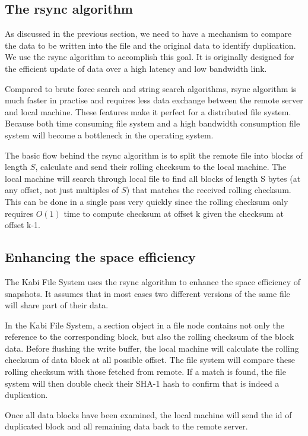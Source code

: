 \subsection{The rsync algorithm}

    As discussed in the previous section, we need to have a mechanism to compare the data to be written into the file and the original data to identify duplication. We use the rsync algorithm to accomplish this goal. It is originally designed for the efficient update of data over a high latency and low bandwidth link.

    Compared to brute force search and string search algorithms, rsync algorithm is much faster in practise and requires less data exchange between the remote server and local machine. These features make it perfect for a distributed file system. Because both time consuming file system and a high bandwidth consumption file system will become a bottleneck in the operating system.

    The basic flow behind the rsync algorithm is to split the remote file into blocks of length $S$, calculate and send their rolling checksum to the local machine. The local machine will search through local file to find all blocks of length S bytes (at any offset, not just multiples of $S$) that matches the received rolling checksum. This can be done in a single pass very quickly since the rolling checksum only requires $O(1)$ time to compute checksum at offset k given the checksum at offset k-1.

\subsection{Enhancing the space efficiency}

    The Kabi File System uses the rsync algorithm to enhance the space efficiency of snapshots. It assumes that in most cases two different versions of the same file will share part of their data.

    In the Kabi File System, a section object in a file node contains not only the reference to the corresponding block, but also the rolling checksum of the block data. Before flushing the write buffer, the local machine will calculate the rolling checksum of data block at all possible offset. The file system will compare these rolling checksum with those fetched from remote. If a match is found, the file system will then double check their SHA-1 hash to confirm that is indeed a duplication.
    
Once all data blocks have been examined, the local machine will send the id of duplicated block and all remaining data back to the remote server.


